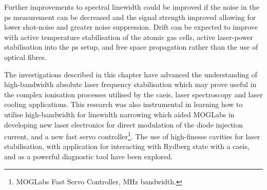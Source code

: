 Further improvements to spectral linewidth could be improved if the noise in the \gls{ps} measurement can be decreased and the signal strength improved allowing for lower shot-noise and greater noise suppression.
Drift can be expected to improve with active temperature stabilisation of the atomic gas cells, active laser-power stabilisation into the \gls{ps} setup, and free space propagation rather than the use of optical fibres.

The investigations described in this chapter have advanced the understanding of high-bandwidth absolute laser frequency stabilisation which may prove useful in the complex ionisation processes utilised by the \gls{caeis}, laser spectroscopy and laser cooling applications.
This research was also instrumental in learning how to utilise high-bandwidth for linewidth narrowing which aided MOGLabs in developing new laser electronics for direct modulation of the diode injection current, and a new fast servo controller\footnote{MOGLabs Fast Servo Controller, \unit[40]{MHz} bandwidth.}.
The use of high-finesse cavities for laser stabilisation, with application for interacting with Rydberg state with a \gls{caeis}, and as a powerful diagnostic tool have been explored.